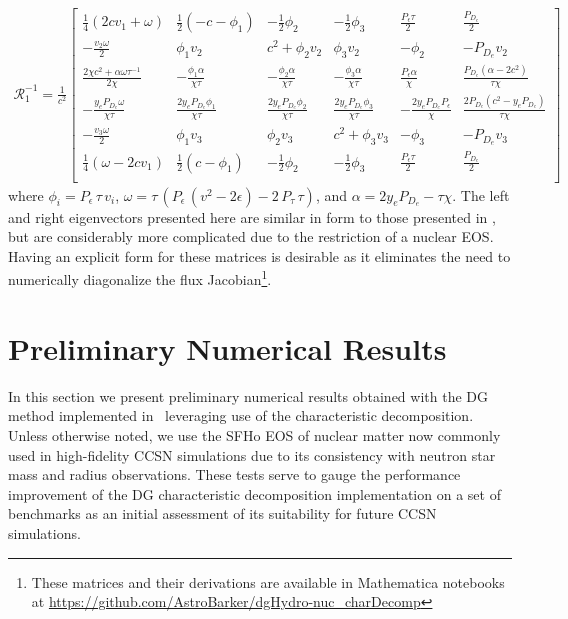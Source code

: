 \documentclass[onecolumn]{aastex62}
\begin{document}
\begin{align*}
  \mathcal{R}_{1}^{-1} = \frac{1}{c^2}
  \left[
  \begin{array}{cccccc}
   \frac{1}{4} (2 c  v_{1}+\omega ) & \frac{1}{2} (-c- \phi_{1} ) & -\frac{1}{2} \phi_{2}
    & -\frac{1}{2} \phi_{3}  & \frac{P_{\epsilon} \tau }{2} & \frac{P_{D_{e}}}{2}
     \\
   -\frac{v_{2} \omega }{2} & \phi_{1} v_{2}  & c^2+\phi_{2} v_{2}  &
     \phi_{3} v_{2}  & -\phi_{2}  & -P_{D_{e}} v_{2}
     \\
   \frac{2 \chi  c^2+\alpha  \omega \tau^{-1} }{2 \chi } & -\frac{\phi_{1} \alpha  }{\chi \tau } &
     -\frac{\phi_{2} \alpha  }{\chi \tau } & -\frac{\phi_{3} \alpha }{\chi \tau } &
     \frac{P_{\epsilon} \alpha }{\chi } & \frac{P_{D_{e}} \left(\alpha -2 c^2\right)}{\tau \chi }
      \\
   -\frac{y_{e} P_{D_{e}} \omega }{\chi \tau } & \frac{2 y_{e} P_{D_{e}} \phi_{1} }{\chi \tau } & \frac{2 y_{e} P_{D_{e}}
     \phi_{2} }{\chi \tau} & \frac{2 y_{e} P_{D_{e}} \phi_{3} }{\chi \tau} & -\frac{2 y_{e}
     P_{D_{e}} P_{\epsilon} }{\chi } & \frac{2 P_{D_{e}} \left(c^2-y_{e} P_{D_{e}} \right)}{\tau  \chi }
      \\
   -\frac{v_{3} \omega }{2} & \phi_{1} v_{3}  & \phi_{2} v_{3}   &
     c^2+\phi_{3} v_{3}  & -\phi_{3}  & -P_{D_{e}} v_{3}
      \\
   \frac{1}{4} (\omega -2 c  v_{1}) & \frac{1}{2} (c-\phi_{1} ) & -\frac{1}{2} \phi_{2}
       & -\frac{1}{2} \phi_{3}  & \frac{P_{\epsilon} \tau }{2} & \frac{P_{D_{e}}}{2}
     \\
  \end{array}
  \right]
\end{align*}
where $\phi_{i} = P_{\epsilon}\,\tau\, v_{i}$,
$\omega = \tau\, (P_{\epsilon}\,(v^2 - 2\epsilon) - 2\,P_{\tau}\,\tau)$, and
$\alpha = 2 y_{e} P_{D_{e}} - \tau \chi$.
The left and right eigenvectors presented here are similar in form to those
presented in \citet{schaal:2015a}, but are considerably more complicated due to the
restriction of a nuclear EOS. Having an explicit form for these matrices is
desirable as it eliminates the need to numerically diagonalize the flux
Jacobian\footnote{These matrices and their derivations are available in Mathematica
notebooks at \url{https://github.com/AstroBarker/dgHydro-nuc_charDecomp}}.

\section{Preliminary Numerical Results}
\label{sec:results}
In this section we present preliminary numerical results obtained with the DG
method implemented in \thornado\, leveraging use of the characteristic
decomposition. Unless otherwise noted, we use the SFHo EOS of
nuclear matter \citep{steiner:2013} now commonly used in high-fidelity CCSN simulations
due to its consistency with neutron star mass and radius observations.
These tests serve to gauge the performance improvement of the
DG characteristic decomposition implementation on a set of benchmarks as an initial
assessment of its suitability for future CCSN simulations.
\end{document}

